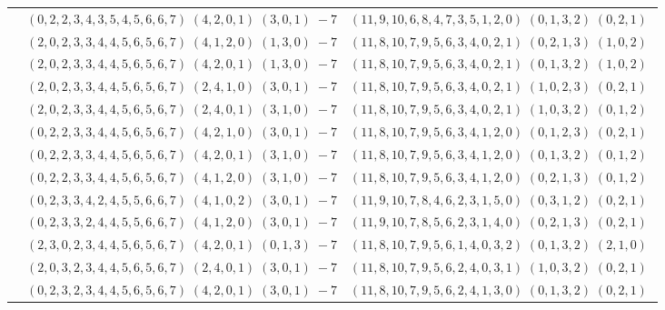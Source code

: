 \documentclass[11pt]{article}
\begin{document}
\begin{longtable}[l]{|c|c|c|}
 \cline{2-3} 
 & $(0 ,2 ,2 ,3 ,4 ,3 ,5 ,4 ,5 ,6 ,6 ,7) \;(4 ,2 ,0 ,1) \;(3 ,0 ,1) \;-7$ & $(11 ,9 ,10 ,6 ,8 ,4 ,7 ,3 ,5 ,1 ,2 ,0) \;(0 ,1 ,3 ,2) \;(0 ,2 ,1) \;$\\ 
 \cline{2-3} 
 & $(2 ,0 ,2 ,3 ,3 ,4 ,4 ,5 ,6 ,5 ,6 ,7) \;(4 ,1 ,2 ,0) \;(1 ,3 ,0) \;-7$ & $(11 ,8 ,10 ,7 ,9 ,5 ,6 ,3 ,4 ,0 ,2 ,1) \;(0 ,2 ,1 ,3) \;(1 ,0 ,2) \;$\\ 
 \cline{2-3} 
 & $(2 ,0 ,2 ,3 ,3 ,4 ,4 ,5 ,6 ,5 ,6 ,7) \;(4 ,2 ,0 ,1) \;(1 ,3 ,0) \;-7$ & $(11 ,8 ,10 ,7 ,9 ,5 ,6 ,3 ,4 ,0 ,2 ,1) \;(0 ,1 ,3 ,2) \;(1 ,0 ,2) \;$\\ 
 \cline{2-3} 
 & $(2 ,0 ,2 ,3 ,3 ,4 ,4 ,5 ,6 ,5 ,6 ,7) \;(2 ,4 ,1 ,0) \;(3 ,0 ,1) \;-7$ & $(11 ,8 ,10 ,7 ,9 ,5 ,6 ,3 ,4 ,0 ,2 ,1) \;(1 ,0 ,2 ,3) \;(0 ,2 ,1) \;$\\ 
 \cline{2-3} 
 & $(2 ,0 ,2 ,3 ,3 ,4 ,4 ,5 ,6 ,5 ,6 ,7) \;(2 ,4 ,0 ,1) \;(3 ,1 ,0) \;-7$ & $(11 ,8 ,10 ,7 ,9 ,5 ,6 ,3 ,4 ,0 ,2 ,1) \;(1 ,0 ,3 ,2) \;(0 ,1 ,2) \;$\\ 
 \cline{2-3} 
 & $(0 ,2 ,2 ,3 ,3 ,4 ,4 ,5 ,6 ,5 ,6 ,7) \;(4 ,2 ,1 ,0) \;(3 ,0 ,1) \;-7$ & $(11 ,8 ,10 ,7 ,9 ,5 ,6 ,3 ,4 ,1 ,2 ,0) \;(0 ,1 ,2 ,3) \;(0 ,2 ,1) \;$\\ 
 \cline{2-3} 
 & $(0 ,2 ,2 ,3 ,3 ,4 ,4 ,5 ,6 ,5 ,6 ,7) \;(4 ,2 ,0 ,1) \;(3 ,1 ,0) \;-7$ & $(11 ,8 ,10 ,7 ,9 ,5 ,6 ,3 ,4 ,1 ,2 ,0) \;(0 ,1 ,3 ,2) \;(0 ,1 ,2) \;$\\ 
 \cline{2-3} 
 & $(0 ,2 ,2 ,3 ,3 ,4 ,4 ,5 ,6 ,5 ,6 ,7) \;(4 ,1 ,2 ,0) \;(3 ,1 ,0) \;-7$ & $(11 ,8 ,10 ,7 ,9 ,5 ,6 ,3 ,4 ,1 ,2 ,0) \;(0 ,2 ,1 ,3) \;(0 ,1 ,2) \;$\\ 
 \cline{2-3} 
 & $(0 ,2 ,3 ,3 ,4 ,2 ,4 ,5 ,5 ,6 ,6 ,7) \;(4 ,1 ,0 ,2) \;(3 ,0 ,1) \;-7$ & $(11 ,9 ,10 ,7 ,8 ,4 ,6 ,2 ,3 ,1 ,5 ,0) \;(0 ,3 ,1 ,2) \;(0 ,2 ,1) \;$\\ 
 \cline{2-3} 
 & $(0 ,2 ,3 ,3 ,2 ,4 ,4 ,5 ,5 ,6 ,6 ,7) \;(4 ,1 ,2 ,0) \;(3 ,0 ,1) \;-7$ & $(11 ,9 ,10 ,7 ,8 ,5 ,6 ,2 ,3 ,1 ,4 ,0) \;(0 ,2 ,1 ,3) \;(0 ,2 ,1) \;$\\ 
 \cline{2-3} 
 & $(2 ,3 ,0 ,2 ,3 ,4 ,4 ,5 ,6 ,5 ,6 ,7) \;(4 ,2 ,0 ,1) \;(0 ,1 ,3) \;-7$ & $(11 ,8 ,10 ,7 ,9 ,5 ,6 ,1 ,4 ,0 ,3 ,2) \;(0 ,1 ,3 ,2) \;(2 ,1 ,0) \;$\\ 
 \cline{2-3} 
 & $(2 ,0 ,3 ,2 ,3 ,4 ,4 ,5 ,6 ,5 ,6 ,7) \;(2 ,4 ,0 ,1) \;(3 ,0 ,1) \;-7$ & $(11 ,8 ,10 ,7 ,9 ,5 ,6 ,2 ,4 ,0 ,3 ,1) \;(1 ,0 ,3 ,2) \;(0 ,2 ,1) \;$\\ 
 \cline{2-3} 
 & $(0 ,2 ,3 ,2 ,3 ,4 ,4 ,5 ,6 ,5 ,6 ,7) \;(4 ,2 ,0 ,1) \;(3 ,0 ,1) \;-7$ & $(11 ,8 ,10 ,7 ,9 ,5 ,6 ,2 ,4 ,1 ,3 ,0) \;(0 ,1 ,3 ,2) \;(0 ,2 ,1) \;$\\ 

\end{longtable}
\end{document}
